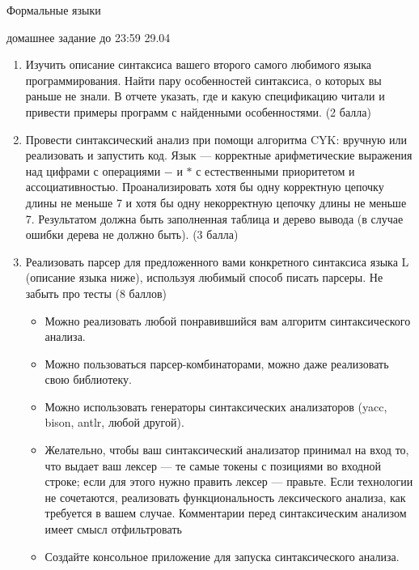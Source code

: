 \documentclass{article}
\begin{document}
\begin{center} {\LARGE Формальные языки} \end{center}

\begin{center} {\Large домашнее задание до 23:59 29.04} \end{center}
\bigskip

\begin{enumerate}
  \item Изучить описание синтаксиса вашего второго самого любимого языка программирования. Найти пару особенностей синтаксиса, о которых вы раньше не знали. В отчете указать, где и какую спецификацию читали и привести примеры программ с найденными особенностями. (2 балла)
  \item Провести синтаксический анализ при помощи алгоритма CYK: вручную или реализовать и запустить код. Язык --- корректные арифметические выражения над цифрами с операциями $-$ и $*$ с естественными приоритетом и ассоциативностью. Проанализировать хотя бы одну корректную цепочку длины не меньше 7 и хотя бы одну некорректную цепочку длины не меньше 7. Результатом должна быть заполненная таблица и дерево вывода (в случае ошибки дерева не должно быть). (3 балла)
  \item Реализовать парсер для предложенного вами конкретного синтаксиса языка L (описание языка ниже), используя любимый способ писать парсеры. Не забыть про тесты (8 баллов)
    \begin{itemize}
        \item Можно реализовать любой понравившийся вам алгоритм синтаксического анализа.
        \item Можно пользоваться парсер-комбинаторами, можно даже реализовать свою библиотеку.
        \item Можно использовать генераторы синтаксических анализаторов (yacc, bison, antlr, любой другой).
        \item Желательно, чтобы ваш синтаксический анализатор принимал на вход то, что выдает ваш лексер --- те самые токены с позициями во входной строке; если для этого нужно править лексер --- правьте. Если технологии не сочетаются, реализовать функциональность лексического анализа, как требуется в вашем случае. Комментарии перед синтаксическим анализом имеет смысл отфильтровать
        \item Создайте консольное приложение для запуска синтаксического анализа.
        \begin{itemize}

\end{itemize}
\end{itemize}
\end{enumerate}
\end{document}
